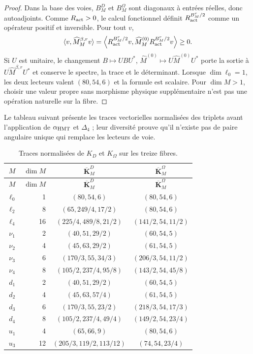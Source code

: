 \begin{proof}
Dans la base des voies, \(B_M^D\) et \(B_M^\Omega\) sont diagonaux à entrées réelles, donc autoadjoints. Comme \(R_{\rm act}>0\), le calcul fonctionnel définit \(R_{\rm act}^{B_M^r/2}\) comme un opérateur positif et inversible. Pour tout \(v\),
\[
 \langle v,\widehat M_M^{\beta,r}v\rangle
 =\left\langle R_{\rm act}^{B_M^r/2}v,
 \widehat M_M^{(0)}R_{\rm act}^{B_M^r/2}v\right\rangle\ge0.
\]
Si \(U\) est unitaire, le changement \(B\mapsto UBU^*\), \(\widehat M^{(0)}\mapsto
U\widehat M^{(0)}U^*\) porte la sortie à \(U\widehat M^{\beta,r}U^*\) et conserve le spectre, la trace et le déterminant. Lorsque \(\dim\ell_0=1\), les deux lecteurs valent \((80,54,6)\) et la formule est scalaire. Pour \(\dim M>1\), choisir une valeur propre sans morphisme physique supplémentaire n'est pas une opération naturelle sur la fibre.
\end{proof}

Le tableau suivant présente les traces vectorielles normalisées des triplets avant l'application de \(\alpha_{\rm HMT}\) et \(\Delta_4\) ; leur diversité prouve qu'il n'existe pas de paire angulaire unique qui remplace les lecteurs de voie.
\begin{longtable}{@{}c r c c@{}}
\caption{Traces normalisées de \(K_D\) et \(K_\Omega\) sur les treize fibres.}
\label{10j-tab-trazas-13}\\
\toprule
\(M\)&\(\dim M\)&\(\overline{\mathbf K}_M^D\)&
\(\overline{\mathbf K}_M^\Omega\)\\
\midrule
\endfirsthead
\toprule
\(M\)&\(\dim M\)&\(\overline{\mathbf K}_M^D\)&
\(\overline{\mathbf K}_M^\Omega\)\\
\midrule
\endhead
\(\ell_0\)&1&\((80,54,6)\)&\((80,54,6)\)\\
\(\ell_2\)&8&\((65,249/4,17/2)\)&\((80,54,6)\)\\
\(\ell_4\)&16&\((225/4,489/8,21/2)\)&\((141/2,54,11/2)\)\\
\(\nu_1\)&2&\((40,51,29/2)\)&\((60,54,5)\)\\
\(\nu_2\)&4&\((45,63,29/2)\)&\((61,54,5)\)\\
\(\nu_3\)&6&\((170/3,55,34/3)\)&\((206/3,54,11/2)\)\\
\(\nu_4\)&8&\((105/2,237/4,95/8)\)&\((143/2,54,45/8)\)\\
\(d_1\)&2&\((40,51,29/2)\)&\((60,54,5)\)\\
\(d_2\)&4&\((45,63,57/4)\)&\((61,54,5)\)\\
\(d_3\)&6&\((170/3,55,23/2)\)&\((218/3,54,17/3)\)\\
\(d_4\)&8&\((105/2,237/4,49/4)\)&\((149/2,54,23/4)\)\\
\(u_1\)&4&\((65,66,9)\)&\((80,54,6)\)\\
\(u_3\)&12&\((205/3,119/2,113/12)\)&\((74,54,23/4)\)\\
\bottomrule
\end{longtable}

